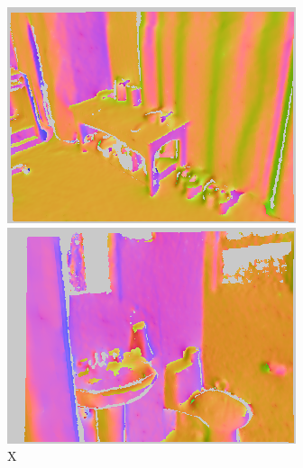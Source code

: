 \begin{figure}
\begin{minipage}{0.19\linewidth}
     \includegraphics[width=\linewidth]{FrameNet/Dataset/pred-000003-X.png}\\
     \includegraphics[width=\linewidth]{FrameNet/Dataset/pred-000021-X.png}\\
     \vspace{-0.05in}
     X
    \end{minipage}
     \begin{minipage}{0.19\linewidth}
     \centering

\end{minipage}
\end{figure}
